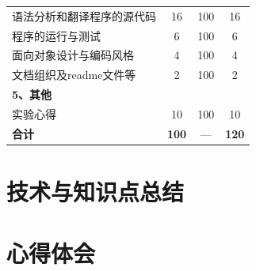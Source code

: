 \begin{table}[htbp]
\begin{tabular}{|p{5.5cm}|c|c|c|}
    \quad 语法分析和翻译程序的源代码 & 16 & 100 & 16 \\
    \quad 程序的运行与测试 & 6 & 100 & 6 \\
    \quad 面向对象设计与编码风格 & 4 & 100 & 4 \\
    \quad 文档组织及readme文件等 & 2 & 100 & 2 \\
    \hline
    \multicolumn{4}{|l|}{\textbf{5、其他}} \\
    \quad 实验心得 & 10 & 100 & 10 \\
    \hline
    \textbf{合计} & \textbf{100} & — & \textbf{120} \\
    \hline
    \end{tabular}
\end{table}

\section{技术与知识点总结}

\section{心得体会}